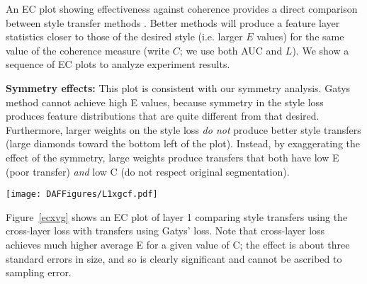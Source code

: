 \documentclass[runningheads]{llncs}
\newcommand{\expect}[1]{{\mathbb{E}}{{\left[{{#1}}\right]}}}
\begin{document}
 An EC plot showing effectiveness against coherence provides a direct comparison between style transfer methods . Better methods will produce a feature layer
statistics closer to those of the desired style (i.e. larger $E$ values) for the same value of the coherence measure
(write $C$; we use both AUC and $L$).  We show a sequence of EC plots to analyze experiment results. 


{\bf Symmetry effects:} This plot is consistent with our symmetry analysis.  Gatys method cannot achieve high E values,
because symmetry in the style loss produces feature distributions that are quite different from that desired.
Furthermore, larger weights on the style loss {\em do not} produce better style transfers (large diamonds toward the
  bottom left of the plot).  Instead, by exaggerating the effect of the symmetry, large weights produce transfers that
  both have low E (poor transfer) {\em and} low C (do not respect original segmentation).  

\begin{figure*}[!htbp]
    \texttt{[image: DAFFigures/L1xgcf.pdf]}
\caption{An EC plot comparing style transfers using cross-layer loss with transfers using Gatys' loss.  Here the C
  statistic is per image AUC.  Point markers show individual image
  statistics (circles=cross layer,  diamonds=Gatys), with color keyed
  to the style and size keyed to the weight on the style loss (larger markers are larger
  weights, corresponding to a stronger weight being placed on style transfer).  Notice that some styles are clearly harder than others, and produce
  low E for both methods.  Notice also that Gatys method produces very
  weak results for high style weights (large diamonds toward the
  bottom left of the plot). The curves are Loess regression curves of E against C, with shadowed regions showing one
  standard error bars up and down.  For any value of C, there is strong evidence that cross-layer loss obtains on
  average a very much larger E than Gatys' loss (about three standard errors difference).  Note that cross-layer loss
  achieves an E comparable with simply resizing the style image; on
  average, E slightly less than 4. }
\label{ecxvg}
\end{figure*}
Figure~\ref{ecxvg} shows an EC plot of layer 1 comparing style transfers using the cross-layer loss with transfers using Gatys' loss.
Note that cross-layer loss achieves much higher average E for a given value of C; the effect is about three standard
errors in size, and so is clearly significant and cannot be ascribed to sampling error.
\end{document}
